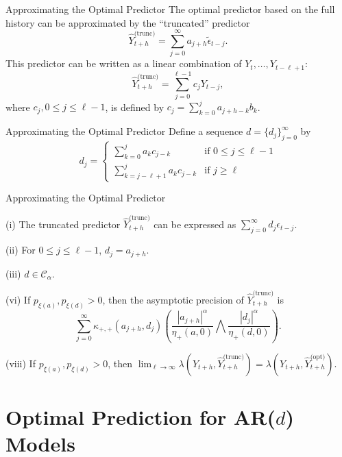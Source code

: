 \documentclass{beamer}
\def\seqSet{\mathcal{C}_{\alpha}}
\def\series{\xi}
\newcommand{\mmultiplier}[4]{\kappa_{#1, #2}(#3, #4)}
\newcommand{\normConst}[3]{\eta_{#1}({#2}, {#3})}
\newcommand{\pred}[1]{\hat{Y}_{t + h}^{\text{(#1)}}}
\begin{document}
\begin{frame}{Approximating the Optimal Predictor}
    The optimal predictor based on the full history can be approximated by the ``truncated'' predictor
    \[
    \pred{trunc} = \sum_{j = 0}^{\infty} a_{j + h}\tilde{\epsilon}_{t - j}.
    \]
    This predictor can be written as a linear combination of $Y_t, \ldots, Y_{t - \ell + 1}$:
    \[
    \pred{trunc} = \sum_{j = 0}^{\ell - 1} c_j Y_{t - j},
    \]
    where $c_j, 0 \le j \le \ell - 1$, is defined by $c_j = \sum_{k = 0}^j a_{j + h - k}b_k$.
\end{frame}

\begin{frame}{Approximating the Optimal Predictor}
    Define a sequence $d = \{d_j\}_{j = 0}^{\infty}$ by
    \[
    d_j =
    \begin{cases}
        \sum_{k = 0}^j a_k c_{j - k} & \text{if $0 \le j \le \ell - 1$} \\
        \sum_{k = j - \ell + 1}^j a_k c_{j - k} & \text{if $j \ge \ell$}
    \end{cases}
    \]
\end{frame}

\begin{frame}{Approximating the Optimal Predictor}
    \begin{theorem}
        (i) The truncated predictor $\pred{trunc}$ can be expressed as $\sum_{j = 0}^{\infty} d_j\epsilon_{t - j}$.
    
        (ii) For $0 \le j \le \ell - 1$, $d_j = a_{j + h}$.
    
        (iii) $d \in \seqSet$.
    
        (vi) If $p_{\series(a)}, p_{\series(d)} > 0$, then the asymptotic precision of $\pred{trunc}$ is
        \[
        \sum_{j = 0}^{\infty} \mmultiplier{+}{+}{a_{j + h}}{d_j}\left(\frac{|a_{j + h}|^{\alpha}}{\normConst{+}{a}{0}} \bigwedge \frac{|d_j|^{\alpha}}{\normConst{+}{d}{0}}\right).
        \]
    
        (viii) If $p_{\series(a)}, p_{\series(d)} > 0$, then $\lim_{\ell \to \infty} \lambda(Y_{t + h}, \pred{trunc}) = \lambda(Y_{t + h}, \pred{opt})$.
    \end{theorem}
\end{frame}

\section{Optimal Prediction for AR($d$) Models}
\end{document}
